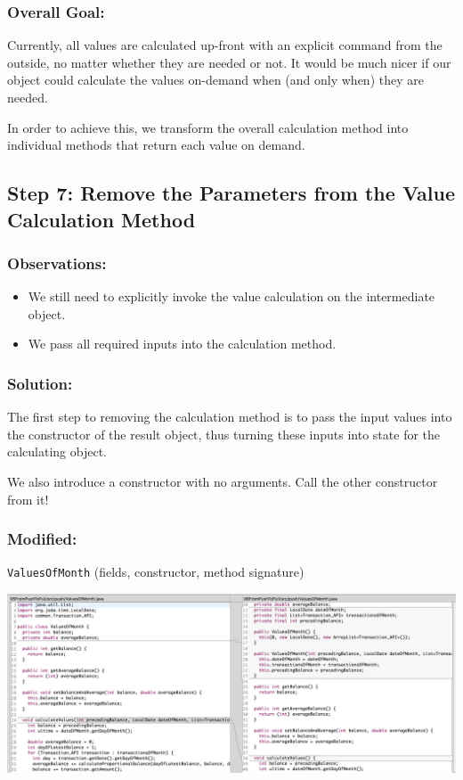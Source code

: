 \documentclass[a4paper,fleqn,titlepage,11pt]{article}
\begin{document}
\subsubsection*{Overall Goal:}

Currently, all values are calculated up-front with an explicit command from the outside, no matter whether they are needed or not. It would be much nicer if our object could calculate the values on-demand when (and only when) they are needed.

In order to achieve this, we transform the overall calculation method into individual methods that return each value on demand.

\subsection*{Step 7: Remove the Parameters from the Value Calculation Method}

\subsubsection*{Observations:}
\begin{itemize}
\item We still need to explicitly invoke the value calculation on the intermediate object. 
\item We pass all required inputs into the calculation method.
\end{itemize}

\subsubsection*{Solution:}

The first step to removing the calculation method is to pass the input values into the constructor of the result object, thus turning these inputs into state for the calculating object.

We also introduce a constructor with no arguments. Call the other constructor from it!

\subsubsection*{Modified:}

\texttt{ValuesOfMonth} (fields, constructor, method signature)

\includegraphics[width=1\textwidth]{CompareViews/05-07-2.png}
\end{document}
